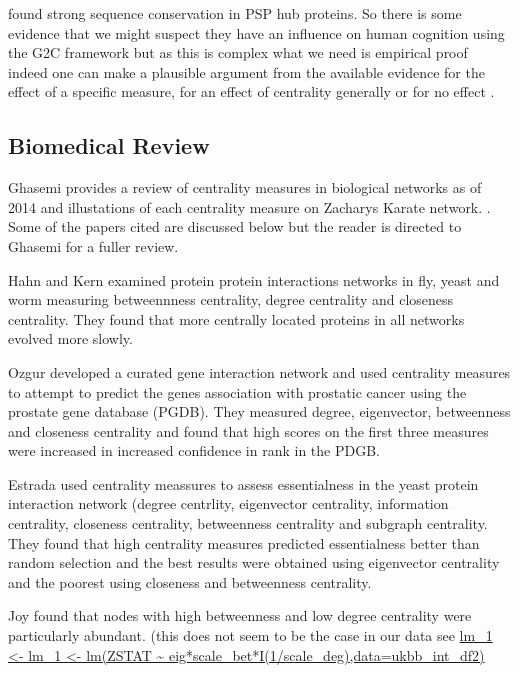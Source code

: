 \cite{bayes2011characterization} found strong sequence conservation in PSP hub proteins. So there is some evidence that we might suspect they have an influence on human cognition using the G2C framework but as this is complex what we need is empirical proof indeed one can make a plausible argument from the available evidence for the effect of a specific measure, for an effect of centrality generally or for no effect .  


\subsection{ Biomedical Review}
Ghasemi provides a review of centrality measures in biological networks as of 2014 and illustations of each centrality measure on Zacharys Karate network.
\cite{ghasemi2014centrality}. Some of the papers cited are discussed below but the reader is directed to Ghasemi \cite{ghasemi2014centrality} for a fuller review. 

Hahn and Kern\cite{hahn2005comparative} examined protein protein interactions networks in fly, yeast and worm measuring betweennness centrality, degree centrality and closeness centrality. They found that more centrally located proteins in all networks evolved more slowly. 

Ozgur \cite{ozgur2008identifying} developed a curated gene interaction network and used centrality measures to attempt to predict the genes association with prostatic cancer using the prostate gene database (PGDB). They measured degree, eigenvector, betweenness and closeness centrality and found that high scores on the first three measures were increased in increased confidence in rank in the PDGB.

Estrada \cite{estrada2006virtual} used centrality meassures to assess essentialness in the yeast protein interaction network (degree centrlity, eigenvector centrality, information centrality, closeness centrality, betweenness centrality and subgraph centrality. They found that high centrality measures predicted essentialness better than random selection and  the best results were obtained using eigenvector centrality and the poorest using closeness and betweenness centrality. 

Joy found that nodes with high betweenness and low degree centrality were particularly abundant.\cite{joy2005high} (this does not seem to be the case in our data see \url{lm_1 <- lm_1 <- lm(ZSTAT ~  eig*scale_bet*I(1/scale_deg),data=ukbb_int_df2)}

